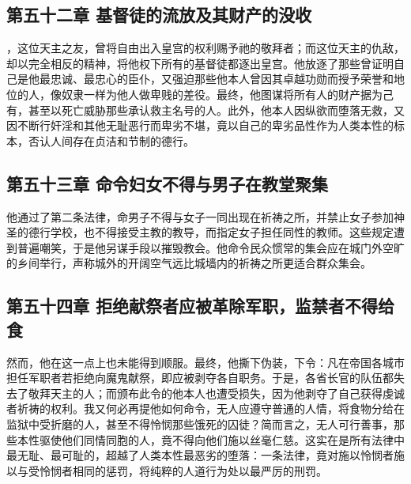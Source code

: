 
\subsection{第五十二章 基督徒的流放及其财产的没收}

，这位天主之友，曾将自由出入皇宫的权利赐予祂的敬拜者；而这位天主的仇敌，却以完全相反的精神，将他权下所有的基督徒都逐出皇宫。他放逐了那些曾证明自己是他最忠诚、最忠心的臣仆，又强迫那些他本人曾因其卓越功勋而授予荣誉和地位的人，像奴隶一样为他人做卑贱的差役。最终，他图谋将所有人的财产据为己有，甚至以死亡威胁那些承认救主名号的人。此外，他本人因纵欲而堕落无救，又因不断行奸淫和其他无耻恶行而卑劣不堪，竟以自己的卑劣品性作为人类本性的标本，否认人间存在贞洁和节制的德行。\par


\subsection{第五十三章 命令妇女不得与男子在教堂聚集}

他通过了第二条法律，命男子不得与女子一同出现在祈祷之所，并禁止女子参加神圣的德行学校，也不得接受主教的教导，而指定女子担任同性的教师。这些规定遭到普遍嘲笑，于是他另谋手段以摧毁教会。他命令民众惯常的集会应在城门外空旷的乡间举行，声称城外的开阔空气远比城墙内的祈祷之所更适合群众集会。\par


\subsection{第五十四章 拒绝献祭者应被革除军职，监禁者不得给食}

然而，他在这一点上也未能得到顺服。最终，他撕下伪装，下令：凡在帝国各城市担任军职者若拒绝向魔鬼献祭，即应被剥夺各自职务。于是，各省长官的队伍都失去了敬拜天主的人；而颁布此令的他本人也遭受损失，因为他剥夺了自己获得虔诚者祈祷的权利。我又何必再提他如何命令，无人应遵守普通的人情，将食物分给在监狱中受折磨的人，甚至不得怜悯那些饿死的囚徒？简而言之，无人可行善事，那些本性驱使他们同情同胞的人，竟不得向他们施以丝毫仁慈。这实在是所有法律中最无耻、最可耻的，超越了人类本性最恶劣的堕落：一条法律，竟对施以怜悯者施以与受怜悯者相同的惩罚，将纯粹的人道行为处以最严厉的刑罚。\par

